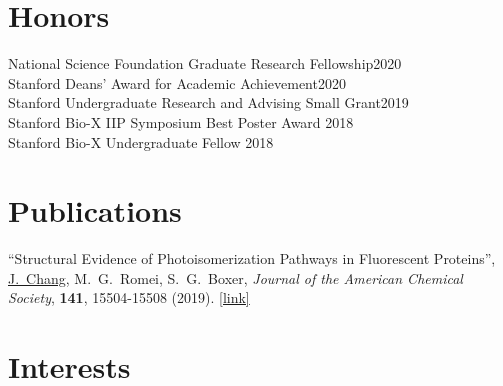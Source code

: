 \documentclass[margin,11pt]{res}
\begin{document}
\begin{resume}

\section{Honors}
 
National Science Foundation Graduate Research Fellowship\hfill 2020 \\
Stanford Deans' Award for Academic Achievement\hfill 2020 \\
Stanford Undergraduate Research and Advising Small Grant\hfill 2019 \\
Stanford Bio-X IIP Symposium Best Poster Award \hfill 2018 \\
Stanford Bio-X Undergraduate Fellow \hfill 2018

\section{Publications}

% 

\begin{changemargin}{0em}{3em}
    ``Structural Evidence of Photoisomerization Pathways in Fluorescent Proteins'',
    \underline{J.\ Chang}, M.\ G.\ Romei, S.\ G.\ Boxer,
    \textit{Journal of the American Chemical Society},
    \textbf{141},
    15504-15508
    (2019).
    \href{http://dx.doi.org/10.1021/jacs.9b08356}{[link]}
\end{changemargin}

\section{Interests}


\end{resume}
\end{document}

